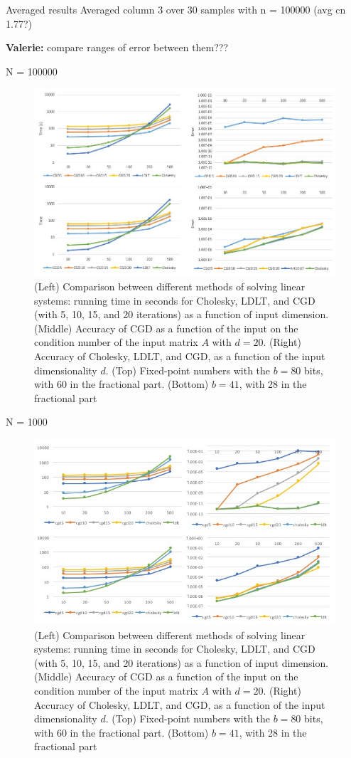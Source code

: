\documentclass{article}
\theoremstyle{plain}
\theoremstyle{definition}
\theoremstyle{remark}
\newcommand{\vc}[1]{{\textcolor{lred}{\textbf{Valerie:} #1}}}
\begin{document}
Averaged results Averaged column 3 over 30 samples with n = 100000 (avg cn 1.77?)

\vc{compare ranges of error between them???}

N = 100000
\begin{figure}[h]
  \includegraphics[width=\linewidth]{results1.jpg}
  \caption{(Left) Comparison between different methods of solving linear systems: running time in seconds for Cholesky, LDLT, and CGD (with 5, 10, 15, and 20 iterations) as a function of input dimension. (Middle) Accuracy of CGD as a function of the input on the condition number of the input matrix $A$ with $d = 20$. (Right) Accuracy of Cholesky, LDLT, and CGD, as a function of the input dimensionality $d$. (Top) Fixed-point numbers with the $b = 80$ bits, with 60 in the fractional part. (Bottom) $b = 41$, with 28 in the fractional part}
  \label{fig:result2}
\end{figure}

N = 1000
\begin{figure}[h]
  \includegraphics[width=\linewidth]{results2.jpg}
  \caption{(Left) Comparison between different methods of solving linear systems: running time in seconds for Cholesky, LDLT, and CGD (with 5, 10, 15, and 20 iterations) as a function of input dimension. (Middle) Accuracy of CGD as a function of the input on the condition number of the input matrix $A$ with $d = 20$. (Right) Accuracy of Cholesky, LDLT, and CGD, as a function of the input dimensionality $d$. (Top) Fixed-point numbers with the $b = 80$ bits, with 60 in the fractional part. (Bottom) $b = 41$, with 28 in the fractional part}
  \label{fig:result2}
\end{figure}
\end{document}
